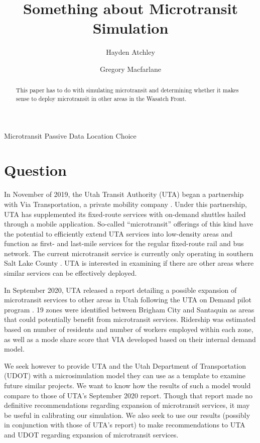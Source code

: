 \documentclass[3p, authoryear]{elsarticle} %
\begin{document}
\begin{frontmatter}

  \title{Something about Microtransit Simulation}
    \author[Brigham Young University]{Hayden Atchley}
    \author[Brigham Young University]{Gregory Macfarlane}
      \address[Brigham Young University]{Civil and Construction Engineering Department, 430 Engineering Building, Provo, Utah 84602}
    
  \begin{abstract}
  This paper has to do with simulating microtransit and determining whether it makes sense to deploy microtransit in other areas in the Wasatch Front.
  \end{abstract}
   \begin{keyword} Microtransit Passive Data Location Choice\end{keyword}
 \end{frontmatter}

\hypertarget{question}{%
\section{Question}\label{question}}

In November of 2019, the Utah Transit Authority (UTA) began a partnership with Via Transportation, a private mobility company \citep{UTAreport}. Under this partnership, UTA has supplemented its fixed-route services with on-demand shuttles hailed through a mobile application. So-called ``microtransit'' offerings of this kind have the potential to efficiently extend UTA services into low-density areas and function as first- and last-mile services for the regular fixed-route rail and bus network. The current microtransit service is currently only operating in southern Salt Lake County \citep{UTAonDemand}. UTA is interested in examining if there are other areas where similar services can be effectively deployed.

In September 2020, UTA released a report detailing a possible expansion of microtransit services to other areas in Utah following the UTA on Demand pilot program \citep{UTAreport}. 19 zones were identified between Brigham City and Santaquin as areas that could potentially benefit from microtransit services. Ridership was estimated based on number of residents and number of workers employed within each zone, as well as a mode share score that VIA developed based on their internal demand model.

We seek however to provide UTA and the Utah Department of Transportation (UDOT) with a microsimulation model they can use as a template to examine future similar projects. We want to know how the results of such a model would compare to those of UTA's September 2020 report. Though that report made no definitive recommendations regarding expansion of microtransit services, it may be useful in calibrating our simulation. We also seek to use our results (possibly in conjunction with those of UTA's report) to make recommendations to UTA and UDOT regarding expansion of microtransit services.
\end{document}
